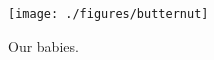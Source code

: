 \begin{figure}[t]
\begin{center}
\texttt{[image: ./figures/butternut]}
\end{center}
\caption*{Our babies.}
\end{figure}



